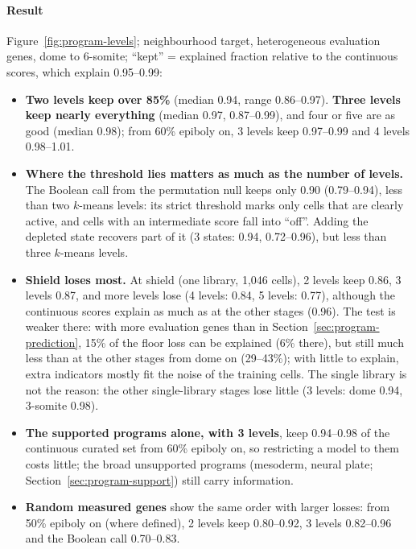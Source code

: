 \documentclass[11pt,a4paper]{article}
\begin{document}
\paragraph{Result} Figure~\ref{fig:program-levels}; neighbourhood target, heterogeneous evaluation genes, dome to 6-somite; ``kept'' = explained fraction relative to the continuous scores, which explain 0.95--0.99:
\begin{itemize}
	\item \textbf{Two levels keep over 85\%} (median 0.94, range 0.86--0.97). \textbf{Three levels keep nearly everything} (median 0.97, 0.87--0.99), and four or five are as good (median 0.98); from 60\% epiboly on, 3 levels keep 0.97--0.99 and 4 levels 0.98--1.01.
	\item \textbf{Where the threshold lies matters as much as the number of levels.} The Boolean call from the permutation null keeps only 0.90 (0.79--0.94), less than two $k$-means levels: its strict threshold marks only cells that are clearly active, and cells with an intermediate score fall into ``off''. Adding the depleted state recovers part of it (3 states: 0.94, 0.72--0.96), but less than three $k$-means levels.
	\item \textbf{Shield loses most.} At shield (one library, 1{,}046 cells), 2 levels keep 0.86, 3 levels 0.87, and more levels lose (4 levels: 0.84, 5 levels: 0.77), although the continuous scores explain as much as at the other stages (0.96). The test is weaker there: with more evaluation genes than in Section~\ref{sec:program-prediction}, 15\% of the floor loss can be explained (6\% there), but still much less than at the other stages from dome on (29--43\%); with little to explain, extra indicators mostly fit the noise of the training cells. The single library is not the reason: the other single-library stages lose little (3 levels: dome 0.94, 3-somite 0.98).
	\item \textbf{The supported programs alone, with 3 levels}, keep 0.94--0.98 of the continuous curated set from 60\% epiboly on, so restricting a model to them costs little; the broad unsupported programs (mesoderm, neural plate; Section~\ref{sec:program-support}) still carry information.
	\item \textbf{Random measured genes} show the same order with larger losses: from 50\% epiboly on (where defined), 2 levels keep 0.80--0.92, 3 levels 0.82--0.96 and the Boolean call 0.70--0.83.
\end{itemize}
\end{document}
